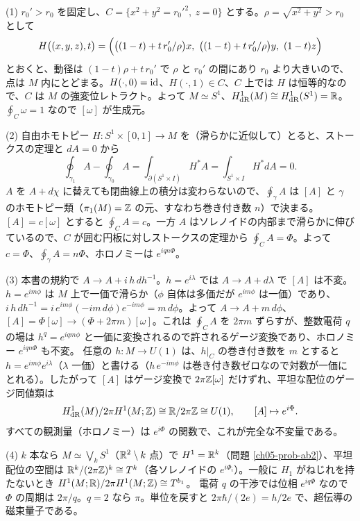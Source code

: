 \begin{solution}
(1) $r_0'>r_0$ を固定し、$C=\{x^2+y^2=r_0'^2,\ z=0\}$ とする。$\rho=\sqrt{x^2+y^2}>r_0$ として
\[
H\bigl((x,y,z),t\bigr)=\Bigl(\bigl((1-t)+t\,r_0'/\rho\bigr)x,\ \bigl((1-t)+t\,r_0'/\rho\bigr)y,\ (1-t)z\Bigr)
\]
とおくと、動径は $(1-t)\rho+t\,r_0'$ で $\rho$ と $r_0'$ の間にあり $r_0$ より大きいので、点は $M$ 内にとどまる。$H(\cdot,0)=\mathrm{id}$、$H(\cdot,1)\in C$、$C$ 上では $H$ は恒等的なので、$C$ は $M$ の強変位レトラクト。よって $M\simeq S^1$、$H^1_{\mathrm{dR}}(M)\cong H^1_{\mathrm{dR}}(S^1)=\mathbb{R}$。$\oint_C\omega=1$ なので $[\omega]$ が生成元。

(2) 自由ホモトピー $H\colon S^1\times[0,1]\to M$ を（滑らかに近似して）とると、ストークスの定理と $dA=0$ から
\[
\oint_{\gamma_1}A-\oint_{\gamma_0}A=\int_{\partial(S^1\times I)}H^*A=\int_{S^1\times I}H^*dA=0 .
\]
$A$ を $A+d\chi$ に替えても閉曲線上の積分は変わらないので、$\oint_\gamma A$ は $[A]$ と $\gamma$ のホモトピー類（$\pi_1(M)=\mathbb{Z}$ の元、すなわち巻き付き数 $n$）で決まる。$[A]=c[\omega]$ とすると $\oint_C A=c$。一方 $A$ はソレノイドの内部まで滑らかに伸びているので、$C$ が囲む円板に対しストークスの定理から $\oint_CA=\Phi$。よって $c=\Phi$、$\oint_\gamma A=n\Phi$、ホロノミーは $e^{iqn\Phi}$。

(3) 本書の規約で $A\to A+i\,h\,dh^{-1}$。$h=e^{i\lambda}$ では $A\to A+d\lambda$ で $[A]$ は不変。$h=e^{im\phi}$ は $M$ 上で一価で滑らか（$\phi$ 自体は多価だが $e^{im\phi}$ は一価）であり、$i\,h\,dh^{-1}=i\,e^{im\phi}(-im\,d\phi)e^{-im\phi}=m\,d\phi$。よって $A\to A+m\,d\phi$、$[A]=\Phi[\omega]\to(\Phi+2\pi m)[\omega]$。これは $\oint_CA$ を $2\pi m$ ずらすが、整数電荷 $q$ の場は $h^q=e^{iqm\phi}$ と一価に変換されるので許されるゲージ変換であり、ホロノミー $e^{iqn\Phi}$ も不変。
任意の $h\colon M\to U(1)$ は、$h|_C$ の巻き付き数を $m$ とすると $h=e^{im\phi}e^{i\lambda}$（$\lambda$ 一価）と書ける（$h\,e^{-im\phi}$ は巻き付き数ゼロなので対数が一価にとれる）。したがって $[A]$ はゲージ変換で $2\pi\mathbb{Z}[\omega]$ だけずれ、平坦な配位のゲージ同値類は
\[
H^1_{\mathrm{dR}}(M)/2\pi H^1(M;\mathbb{Z})\cong\mathbb{R}/2\pi\mathbb{Z}\cong U(1),\qquad[A]\mapsto e^{i\Phi}.
\]
すべての観測量（ホロノミー）は $e^{i\Phi}$ の関数で、これが完全な不変量である。

(4) $k$ 本なら $M\simeq\bigvee_kS^1$（$\mathbb{R}^2\setminus k$ 点）で $H^1=\mathbb{R}^k$（問題 \ref{ch05-prob-ab2}）、平坦配位の空間は $\mathbb{R}^k/(2\pi\mathbb{Z})^k\cong T^k$（各ソレノイドの $e^{i\Phi_i}$）。一般に $H_1$ がねじれを持たないとき $H^1(M;\mathbb{R})/2\pi H^1(M;\mathbb{Z})\cong T^{b_1}$。
電荷 $q$ の干渉では位相 $e^{iq\Phi}$ なので $\Phi$ の周期は $2\pi/q$。$q=2$ なら $\pi$。単位を戻すと $2\pi\hbar/(2e)=h/2e$ で、超伝導の磁束量子である。
\end{solution}

